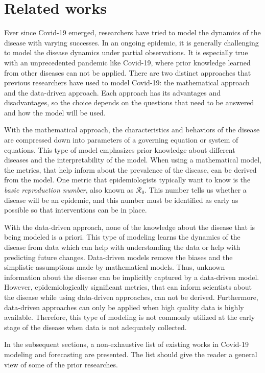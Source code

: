 \section{Related works}

Ever since Covid-19 emerged, researchers have tried to model the dynamics of the disease with varying successes.
In an ongoing epidemic, it is generally challenging to model the disease dynamics under partial observations.
It is especially true with an unprecedented pandemic like Covid-19, where prior knowledge learned from other diseases can not be applied.
There are two distinct approaches that previous researchers have used to model Covid-19: the mathematical approach and the data-driven approach.
Each approach has its advantages and disadvantages, so the choice depends on the questions that need to be answered and how the model will be used.

With the mathematical approach, the characteristics and behaviors of the disease are compressed down into parameters of a governing equation or system of equations.
This type of model emphasizes prior knowledge about different diseases and the interpretability of the model.
When using a mathematical model, the metrics, that help inform about the prevalence of the disease, can be derived from the model.
One metric that epidemiologists typically want to know is the \textit{basic reproduction number}, also known as $\mathcal{R}_0$.
This number tells us whether a disease will be an epidemic, and this number must be identified as early as possible so that interventions can be in place.

With the data-driven approach, none of the knowledge about the disease that is being modeled is a priori.
This type of modeling learns the dynamics of the disease from data which can help with understanding the data or help with predicting future changes.
Data-driven models remove the biases and the simplistic assumptions made by mathematical models.
Thus, unknown information about the disease can be implicitly captured by a data-driven model.
However, epidemiologically significant metrics, that can inform scientists about the disease while using data-driven approaches, can not be derived.
Furthermore, data-driven approaches can only be applied when high quality data is highly available.
Therefore, this type of modeling is not commonly utilized at the early stage of the disease when data is not adequately collected.

In the subsequent sections, a non-exhaustive list of existing works in Covid-19 modeling and forecasting are presented.
The list should give the reader a general view of some of the prior researches.

